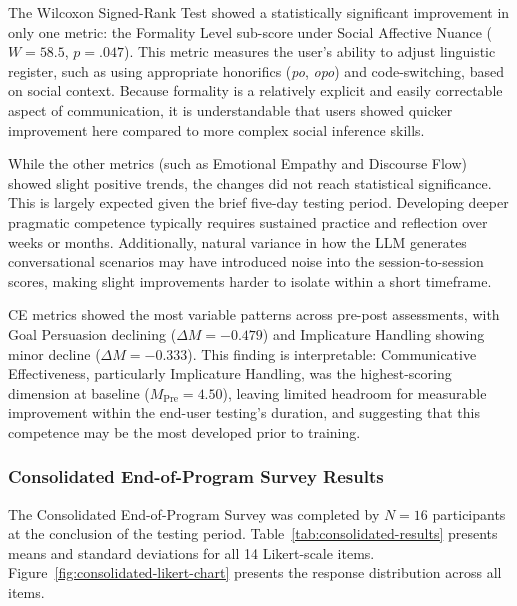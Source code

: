 \noindent The Wilcoxon Signed-Rank Test showed a statistically significant improvement in only one metric: the Formality Level sub-score under Social Affective Nuance ($W = 58.5$, $p = .047$). This metric measures the user's ability to adjust linguistic register, such as using appropriate honorifics (\textit{po}, \textit{opo}) and code-switching, based on social context. Because formality is a relatively explicit and easily correctable aspect of communication, it is understandable that users showed quicker improvement here compared to more complex social inference skills.

While the other metrics (such as Emotional Empathy and Discourse Flow) showed slight positive trends, the changes did not reach statistical significance. This is largely expected given the brief five-day testing period. Developing deeper pragmatic competence typically requires sustained practice and reflection over weeks or months. Additionally, natural variance in how the LLM generates conversational scenarios may have introduced noise into the session-to-session scores, making slight improvements harder to isolate within a short timeframe.

CE metrics showed the most variable patterns across pre-post assessments, with Goal Persuasion declining ($\Delta M = -0.479$) and Implicature Handling showing minor decline ($\Delta M = -0.333$). This finding is interpretable: Communicative Effectiveness, particularly Implicature Handling, was the highest-scoring dimension at baseline ($M_{\text{Pre}} = 4.50$), leaving limited headroom for measurable improvement within the end-user testing's duration, and suggesting that this competence may be the most developed prior to training.

\subsubsection{Consolidated End-of-Program Survey Results}

The Consolidated End-of-Program Survey was completed by $N = 16$ participants at the conclusion of the testing period. Table~\ref{tab:consolidated-results} presents means and standard deviations for all 14 Likert-scale items. Figure~\ref{fig:consolidated-likert-chart} presents the response distribution across all items.

